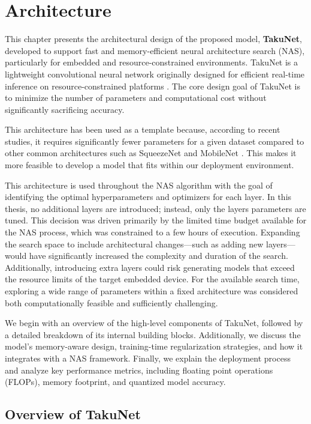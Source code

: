 \chapter{Architecture}
\label{chap:Architecture}

This chapter presents the architectural design of the proposed model, \textbf{TakuNet}, developed to support fast and memory-efficient neural architecture search (NAS), particularly for embedded and resource-constrained environments. 
TakuNet is a lightweight convolutional neural network originally designed for efficient real-time inference on resource-constrained platforms \cite{TakuNet}.
The core design goal of TakuNet is to minimize the number of parameters and computational cost without significantly sacrificing accuracy.

This architecture has been used as a template because, according to recent studies, it requires significantly fewer parameters for a given dataset compared to other common architectures such as SqueezeNet and MobileNet \cite{TakuNet}. This makes it more feasible to develop a model that fits within our deployment environment.

This architecture is used throughout the NAS algorithm with the goal of identifying the optimal hyperparameters and optimizers for each layer. In this thesis, no additional layers are introduced; instead, only the layers parameters are tuned. This decision was driven primarily by the limited time budget available for the NAS process, which was constrained to a few hours of execution. Expanding the search space to include architectural changes—such as adding new layers—would have significantly increased the complexity and duration of the search. Additionally, introducing extra layers could risk generating models that exceed the resource limits of the target embedded device. For the available search time, exploring a wide range of parameters within a fixed architecture was considered both computationally feasible and sufficiently challenging.


We begin with an overview of the high-level components of TakuNet, followed by a detailed breakdown of its internal building blocks. Additionally, we discuss the model’s memory-aware design, training-time regularization strategies, and how it integrates with a NAS framework. Finally, we explain the deployment process and analyze key performance metrics, including floating point operations (FLOPs), memory footprint, and quantized model accuracy.


\section{Overview of TakuNet}

